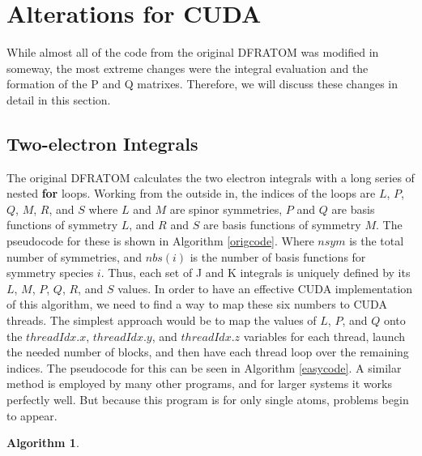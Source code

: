 \documentclass[12pt]{report}
\newtheorem{algorithm}[theorem]{Algorithm}
\begin{document}
\section{Alterations for CUDA}
While almost all of the code from the original DFRATOM was modified in someway, the most extreme changes were the integral evaluation and the formation of the P and Q matrixes. Therefore, we will discuss these changes in detail in this section.

\subsection{Two-electron Integrals}
The original DFRATOM calculates the two electron integrals with a long series of nested \textbf{for} loops. Working from the outside in, the indices of the loops are $L$, $P$, $Q$, $M$, $R$, and $S$ where $L$ and $M$ are spinor symmetries, $P$ and $Q$ are basis functions of symmetry $L$, and $R$ and $S$ are basis functions of symmetry $M$. The pseudocode for these is shown in Algorithm \ref{origcode}. Where $nsym$ is the total number of symmetries, and $nbs(i)$ is the number of basis functions for symmetry species $i$. Thus, each set of J and K integrals is uniquely defined by its $L$, $M$, $P$, $Q$, $R$, and $S$ values. In order to have an effective CUDA implementation of this algorithm, we need to find a way to map these six numbers to CUDA threads. The simplest approach would be to map the values of $L$, $P$, and $Q$ onto the $threadIdx.x$, $threadIdx.y$, and $threadIdx.z$ variables for each thread, launch the needed number of blocks, and then have each thread loop over the remaining indices. The pseudocode for this can be seen in Algorithm \ref{easycode}. A similar method is employed by many other programs, and for larger systems it works perfectly well. But because this program is for only single atoms, problems begin to appear.

\begin{algorithm}
\caption{The original }
\label{origcode}
\begin{algorithmic}
				\ELSE
				\ENDIF
					\ELSE
					\ENDIF
					\ENDFOR
				\ENDFOR
			\ENDFOR
		\ENDFOR
	\ENDFOR
\ENDFOR
\end{algorithmic}
\end{algorithm}
\end{document}

